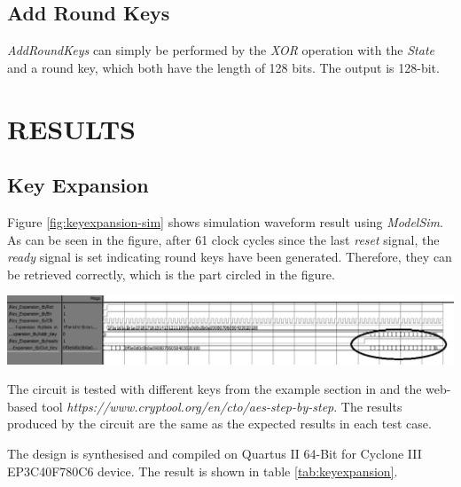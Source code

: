 \documentclass[a4paper, 10pt]{article}
\newenvironment{Figure}
    {\par\medskip\noindent\minipage{\linewidth}}
    {\endminipage\par\medskip}
\begin{document}
\begin{multicols}{2}
            \subsection{Add Round Keys}

            \textit{AddRoundKeys} can simply be performed by the \textit{XOR} operation with the \textit{State} and a round key, which both have the length of 128 bits. The output is 128-bit.

        \section{RESULTS}

        \subsection{Key Expansion}

        Figure \ref{fig:keyexpansion-sim} shows simulation waveform result using \textit{ModelSim}. As can be seen in the figure, after 61 clock cycles since the last \textit{reset} signal, the \textit{ready} signal is set indicating round keys have been generated. Therefore, they can be retrieved correctly, which is the part circled in the figure.

            \begin{Figure}
                \centering
                \includegraphics[width=\linewidth]{KeyExpansion-GetRoundKeysStage-edited.png}
                \label{fig:keyexpansion-sim}
            \end{Figure}

        The circuit is tested with different keys from the example section in \cite{AES} and the web-based tool \textit{https://www.cryptool.org/en/cto/aes-step-by-step}. The results produced by the circuit are the same as the expected results in each test case.

	The design is synthesised and compiled on Quartus II 64-Bit for Cyclone III EP3C40F780C6 device. The result is shown in table \ref{tab:keyexpansion}.


\end{multicols}
\end{document}
